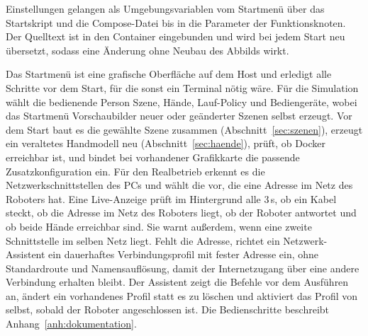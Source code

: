 Einstellungen gelangen als Umgebungsvariablen vom Startmenü über das Startskript und die Compose-\hspace{0pt}Datei bis in die Parameter der Funktionsknoten.
Der Quelltext ist in den Container eingebunden und wird bei jedem Start neu übersetzt, sodass eine Änderung ohne Neubau des Abbilds wirkt.

Das Startmenü ist eine grafische Oberfläche auf dem Host und erledigt alle Schritte vor dem Start, für die sonst ein Terminal nötig wäre.
Für die Simulation wählt die bedienende Person Szene, Hände, Lauf-Policy und Bediengeräte, wobei das Startmenü Vorschaubilder neuer oder geänderter Szenen selbst erzeugt.
Vor dem Start baut es die gewählte Szene zusammen (Abschnitt~\ref{sec:szenen}), erzeugt ein veraltetes Handmodell neu (Abschnitt~\ref{sec:haende}), prüft, ob Docker erreichbar ist, und bindet bei vorhandener Grafikkarte die passende Zusatzkonfiguration ein.
Für den Realbetrieb erkennt es die Netzwerkschnittstellen des PCs und wählt die vor, die eine Adresse im Netz des Roboters hat.
Eine Live-Anzeige prüft im Hintergrund alle 3\,s, ob ein Kabel steckt, ob die Adresse im Netz des Roboters liegt, ob der Roboter antwortet und ob beide Hände erreichbar sind. Sie warnt außerdem, wenn eine zweite Schnittstelle im selben Netz liegt.
Fehlt die Adresse, richtet ein Netzwerk-Assistent ein dauerhaftes Verbindungsprofil mit fester Adresse ein, ohne Standardroute und Namensauflösung, damit der Internetzugang über eine andere Verbindung erhalten bleibt.
Der Assistent zeigt die Befehle vor dem Ausführen an, ändert ein vorhandenes Profil statt es zu löschen und aktiviert das Profil von selbst, sobald der Roboter angeschlossen ist.
Die Bedienschritte beschreibt Anhang~\ref{anh:dokumentation}.

